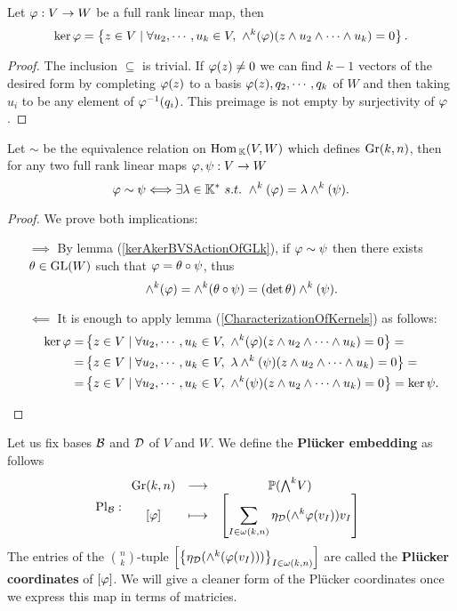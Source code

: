 \begin{lemma}\label{CharacterizationOfKernels}
Let $\varphi:V\to W$ be a full rank linear map, then
\[\ker\varphi=\left\{{z\in V\mid \forall u_2,\cdots, u_k\in V,\ \wedge^k(\varphi)(z\wedge u_2\wedge\cdots\wedge u_k)=0}\right\}.\]
\end{lemma}
\begin{proof}
The inclusion $\subseteq$ is trivial. If $\varphi(z)\neq 0$ we can find $k-1$ vectors of the desired form by completing $\varphi(z)$ to a basis $\varphi(z),q_2,\cdots,q_k$ of $W$ and then taking $u_i$ to be any element of $\varphi^{-1}(q_i)$. This preimage is not empty by surjectivity of $\varphi$.
\end{proof}

\begin{proposition}\label{PluckerMapInjectiveOnGrassmanniansUpToScalar}
Let $\sim$ be the equivalence relation on $\mathrm{Hom}\,_{\mathbb{K}}(V,W)$ which defines $\mathrm{Gr}(k,n)$, then for any two full rank linear maps $\varphi,\psi:V\to W$
\[\vp\sim \psi\coimplies \exists \la\in\K^\ast\ s.t.\ \wedge^k(\vp)=\la\wedge^k(\psi).\]
\end{proposition}
\begin{proof}
We prove both implications:
\setlength{\leftmargini}{0cm}
\begin{itemize}
\item[$\boxed{\implies}$] By lemma (\ref{kerAkerBVSActionOfGLk}), if $\varphi\sim \psi$ then there exists $\theta\in \mathrm{GL}(W)$ such that $\varphi=\theta\circ \psi$, thus
\[\wedge^k(\varphi)=\wedge^k(\theta\circ \psi)=(\det\theta) \wedge^k(\psi).\]
\item[$\boxed{\impliedby}$] It is enough to apply lemma (\ref{CharacterizationOfKernels}) as follows:
\begin{align*}
\ker\vp=&\cpa{z\in V\mid \forall u_2,\cdots, u_k\in V,\ \wedge^k(\vp)(z\wedge u_2\wedge \cdots\wedge u_k)=0}=\\
=&\cpa{z\in V\mid \forall u_2,\cdots, u_k\in V,\ \la\wedge^k(\psi)(z\wedge u_2\wedge\cdots\wedge u_k)=0}=\\
=&\cpa{z\in V\mid \forall u_2,\cdots, u_k\in V,\ \wedge^k(\psi)(z\wedge u_2\wedge \cdots\wedge u_k)=0}=\ker \psi.
\end{align*}
\end{itemize}
\setlength{\leftmargini}{0.5cm}
\end{proof}


\begin{definition}
Let us fix bases $\mathcal{B}$ and $\mathcal{D}$ of $V$ and $W$. We define the \textbf{Pl\"ucker embedding} as follows
\[\Pl_\Bc:\funcDef{\Gr(k,n)}{\Pj(\bw V)}{[\vp]}{\displaystyle\spa{\sum_{I\in \omega(k,n)} \eta_\Dc(\wedge^k\vp(v_I))v_I}}\]
The entries of the $\binom nk$-tuple $\left[{\left\{{\eta_{\mathcal{D}}(\wedge^k(\varphi(v_I)))}\right\}_{I\in\omega(k,n)}}\right]$ are called the \textbf{Pl\"ucker coordinates} of $[\varphi]$. We will give a cleaner form of the Pl\"ucker coordinates once we express this map in terms of matricies.
\end{definition}


